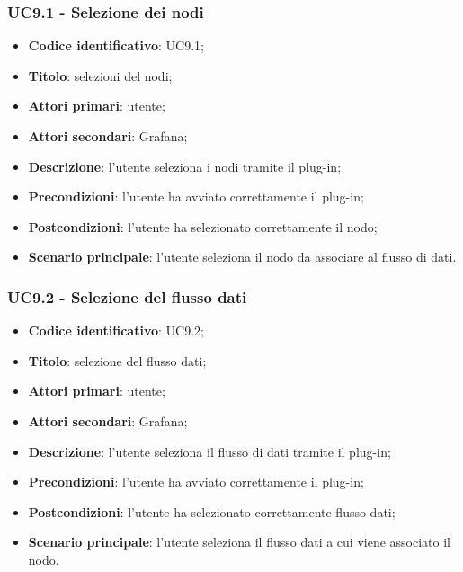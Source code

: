 \subsubsection{UC9.1 - Selezione dei nodi}
\begin{itemize}
	\item \textbf{Codice identificativo}: UC9.1;
	\item \textbf{Titolo}: selezioni del nodi;
	\item \textbf{Attori primari}: utente;
	\item \textbf{Attori secondari}: Grafana\glo;
	\item \textbf{Descrizione}: l'utente seleziona i nodi tramite il plug-in;
	\item \textbf{Precondizioni}: l'utente ha avviato correttamente il plug-in;
	\item \textbf{Postcondizioni}: l'utente ha selezionato correttamente il nodo;
	\item \textbf{Scenario principale}: l'utente seleziona il nodo da associare al flusso di dati.
\end{itemize}

\subsubsection{UC9.2 - Selezione del flusso dati}
\begin{itemize}
	\item \textbf{Codice identificativo}: UC9.2;
	\item \textbf{Titolo}: selezione del flusso dati;
	\item \textbf{Attori primari}: utente;
	\item \textbf{Attori secondari}: Grafana\glo;
	\item \textbf{Descrizione}: l'utente seleziona il flusso di dati tramite il plug-in;
	\item \textbf{Precondizioni}: l'utente ha avviato correttamente il plug-in;
	\item \textbf{Postcondizioni}: l'utente ha selezionato correttamente flusso dati;
	\item \textbf{Scenario principale}: l'utente seleziona il flusso dati a cui viene associato il nodo.
\end{itemize}

